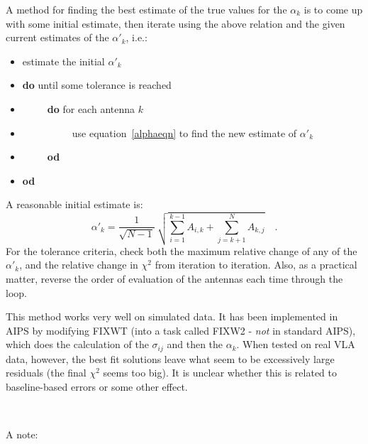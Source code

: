 \documentclass[11pt]{article}
\begin{document}
A method for finding the best estimate of the true values for the
$\alpha_k$ is to come up with some initial estimate, then iterate using
the above relation and the given current estimates of the $\alpha'_k$,
i.e.:

{
\samepage
\begin{itemize}
   \item[] estimate the initial $\alpha'_k$
   \vspace*{-3truemm}
   \item[] {\bf do} until some tolerance is reached
   \vspace*{-3truemm}
   \item[] \ \ \ \ \ {\bf do} for each antenna $k$
   \vspace*{-3truemm}
   \item[] \ \ \ \ \ \ \ \ \ \ use equation~\ref{alphaeqn} to find the
              new estimate of $\alpha'_k$
   \vspace*{-3truemm}
   \item[] \ \ \ \ \ {\bf od}
   \vspace*{-3truemm}
   \item[] {\bf od}
\end{itemize}
}

A reasonable initial estimate is:
\begin{equation}
   \alpha'_k = \frac{1}{\sqrt{N - 1}} \
               \sqrt{ \displaystyle \sum_{i=1}^{k-1} A_{i,k} +
                           \sum_{j=k+1}^N A_{k,j}}
   \quad .
\end{equation}
For the tolerance criteria, check both the maximum relative change
of any of the $\alpha'_k$, and the relative change in $\chi^2$ from
iteration to iteration.  Also, as a practical matter, reverse the
order of evaluation of the antennas each time through the loop.

This method works very well on simulated data.  It has been implemented
in AIPS by modifying FIXWT (into a task called FIXW2 - {\it not} in
standard AIPS), which does the calculation of the $\sigma_{ij}$ and
then the $\alpha_k$.  When tested on real VLA data, however, the best
fit solutions leave what seem to be excessively large residuals (the
final $\chi^2$ seems too big).  It is unclear whether this is related
to baseline-based errors or some other effect.

\

\noindent A note:
\end{document}
